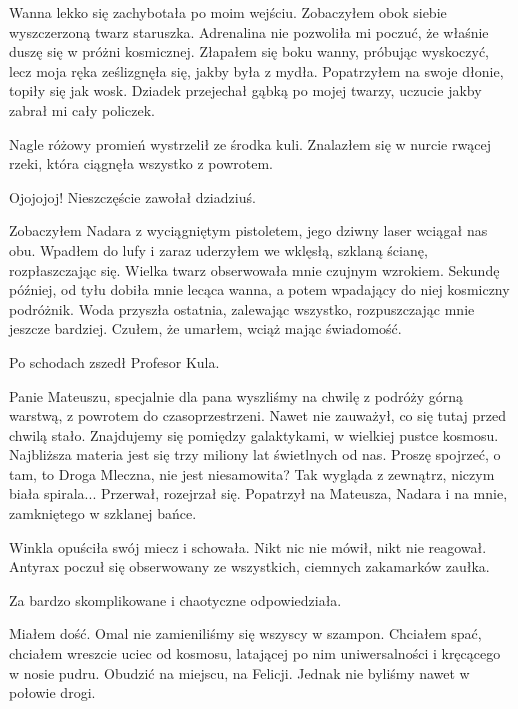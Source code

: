 Wanna lekko się zachybotała po moim wejściu.
Zobaczyłem obok siebie wyszczerzoną twarz staruszka.
Adrenalina nie pozwoliła mi poczuć, że właśnie duszę się w próżni kosmicznej.
Złapałem się boku wanny, próbując wyskoczyć, lecz moja ręka ześlizgnęła się, jakby była z mydła.
Popatrzyłem na swoje dłonie, topiły się jak wosk.
Dziadek przejechał gąbką po mojej twarzy, uczucie jakby zabrał mi cały policzek.

Nagle różowy promień wystrzelił ze środka kuli.
Znalazłem się w nurcie rwącej rzeki, która ciągnęła wszystko z powrotem.
\begin{dialogue}
\ds{} Ojojojoj! Nieszczęście \dm{} zawołał dziadziuś.
\end{dialogue}
Zobaczyłem Nadara z wyciągniętym pistoletem, jego dziwny laser wciągał nas obu. Wpadłem do lufy i zaraz uderzyłem we wklęsłą, szklaną ścianę, rozpłaszczając się.
Wielka twarz obserwowała mnie czujnym wzrokiem.
Sekundę później, od tyłu dobiła mnie lecąca wanna, a potem wpadający do niej kosmiczny podróżnik.
Woda przyszła ostatnia, zalewając wszystko, rozpuszczając mnie jeszcze bardziej.
Czułem, że umarłem, wciąż mając świadomość.

Po schodach zszedł Profesor Kula.
\begin{dialogue}
\ds{} Panie Mateuszu, specjalnie dla pana wyszliśmy na chwilę z podróży górną warstwą, z powrotem do czasoprzestrzeni. \dm{} Nawet nie zauważył, co się tutaj przed chwilą stało.
\dm{} Znajdujemy się pomiędzy galaktykami,  w wielkiej pustce kosmosu. Najbliższa materia jest się trzy miliony lat świetlnych od nas. Proszę spojrzeć, 
o tam, to Droga Mleczna, nie jest niesamowita? Tak wygląda z zewnątrz, niczym biała spirala... \dm{} Przerwał, rozejrzał się. Popatrzył na Mateusza, Nadara i na mnie, zamkniętego w szklanej bańce.
\end{dialogue}

\divider{}

Winkla opuściła swój miecz i schowała. 
Nikt nic nie mówił, nikt nie reagował. 
Antyrax poczuł się obserwowany ze wszystkich, ciemnych zakamarków zaułka.
\begin{dialogue}
\ds{} Za bardzo skomplikowane i chaotyczne \dm{} odpowiedziała.
\end{dialogue}

\divider{}

Miałem dość. Omal nie zamieniliśmy się wszyscy w szampon.
Chciałem spać, chciałem wreszcie uciec od kosmosu, latającej po nim uniwersalności i kręcącego w nosie pudru.
Obudzić na miejscu, na Felicji.
Jednak nie byliśmy nawet w połowie drogi.

